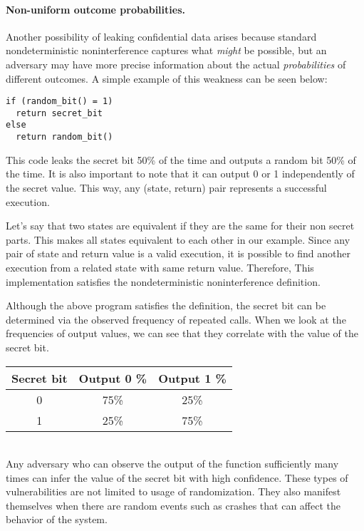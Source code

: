 \paragraph{Non-uniform outcome probabilities.}
Another possibility of leaking confidential data
arises because standard nondeterministic noninterference
captures what \emph{might} be possible, but an adversary may have
more precise information about the actual \emph{probabilities} of
different outcomes. A simple example of this weakness can be seen below: 
%
\begin{verbatim}
if (random_bit() = 1)
  return secret_bit
else
  return random_bit()
\end{verbatim}
%
This code leaks the secret bit 50\% of the time and outputs a random bit 50\% of the time. It is also important to note that it can output 0 or 1 independently of the secret value. This way, any (state, return) pair represents a successful execution. 

Let’s say that two states are equivalent if they are the same for their non secret parts. This makes all states equivalent to each other in our example. Since any pair of state and return value is a valid execution, it is possible to find another execution from a related state with same return value. Therefore, This implementation satisfies the nondeterministic noninterference definition. 

Although the above program satisfies the definition, the secret bit can be determined via the observed frequency of repeated calls. When we look at the frequencies of output values, we can see that they correlate with the value of the secret bit. \\

\begin{tabular}{| c | c | c |}
	\hline
	Secret bit & Output 0 \% & Output 1 \% \\
	\hline
	0 &	75\% & 25\% \\
	\hline
	1 &	25\% & 75\% \\
	\hline
\end{tabular}\\

Any adversary who can observe the output of the function sufficiently many times can infer the value of the secret bit with high confidence. These types of vulnerabilities are not limited to usage of randomization. They also manifest themselves when there are random events such as crashes that can affect the behavior of the system.


